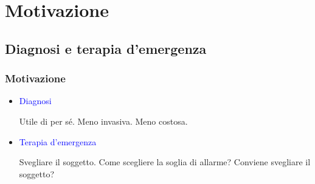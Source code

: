 \section{Motivazione}
  \subsection{Diagnosi e terapia d'emergenza}


  \begin{frame}
  \frametitle{Motivazione}
\endcenter

\begin{itemize}
 \item[] 
    \textcolor{blue}{Diagnosi}

    Utile di per s\'e. Meno invasiva. Meno costosa.
 \item[]
  \textcolor{blue}{Terapia d'emergenza}

  Svegliare il soggetto. Come scegliere la soglia di allarme? Conviene svegliare il soggetto?
\end{itemize}



% 
%   
% 
% 
\end{frame}


